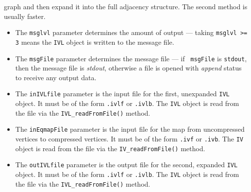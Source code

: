 \begin{enumerate}
graph and then expand it into the full adjacency structure.
The second method is usually faster.
\par
\begin{itemize}
\item
The {\tt msglvl} parameter determines the amount of output ---
taking {\tt msglvl >= 3} means the {\tt IVL} object is written
to the message file.
\item
The {\tt msgFile} parameter determines the message file --- if {\tt
msgFile} is {\tt stdout}, then the message file is {\it stdout},
otherwise a file is opened with {\it append} status to receive any
output data.
\item
The {\tt inIVLfile} parameter is the input file for the first,
unexpanded {\tt IVL} object. 
It must be of the form {\tt *.ivlf} or {\tt *.ivlb}.
The {\tt IVL} object is read from the file via the
{\tt IVL\_readFromFile()} method.
\item
The {\tt inEqmapFile} parameter is the input file for the map from
uncompressed vertices to compressed vertices.
It must be of the form {\tt *.ivf} or {\tt *.ivb}.
The {\tt IV} object is read from the file via the
{\tt IV\_readFromFile()} method.
\item
The {\tt outIVLfile} parameter is the output file for the second,
expanded {\tt IVL} object. 
It must be of the form {\tt *.ivlf} or {\tt *.ivlb}.
The {\tt IVL} object is read from the file via the
{\tt IVL\_readFromFile()} method.
\end{itemize}
\end{enumerate}
